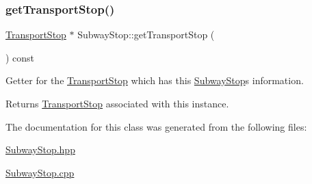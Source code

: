 \subsubsection{\texorpdfstring{get\+Transport\+Stop()}{getTransportStop()}}
{\footnotesize\ttfamily \hyperlink{class_transport_stop}{Transport\+Stop} $\ast$ Subway\+Stop\+::get\+Transport\+Stop (\begin{DoxyParamCaption}{ }\end{DoxyParamCaption}) const}

Getter for the \hyperlink{class_transport_stop}{Transport\+Stop} which has this \hyperlink{class_subway_stop}{Subway\+Stop}\textquotesingle{}s information.

\begin{DoxyReturn}{Returns}
\hyperlink{class_transport_stop}{Transport\+Stop} associated with this instance. 
\end{DoxyReturn}


The documentation for this class was generated from the following files\+:\begin{DoxyCompactItemize}
\item 
\hyperlink{_subway_stop_8hpp}{Subway\+Stop.\+hpp}\item 
\hyperlink{_subway_stop_8cpp}{Subway\+Stop.\+cpp}\end{DoxyCompactItemize}
